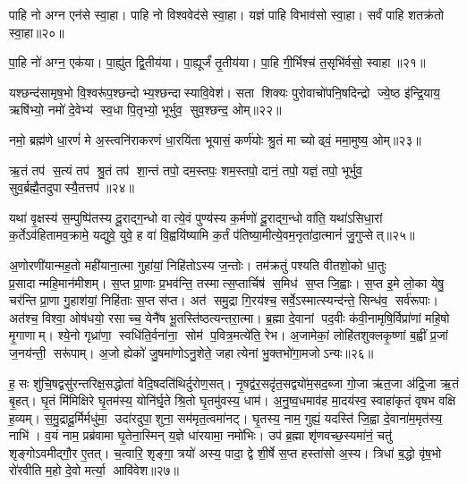 पाहि नो अग्न एन॑से स्वा॒हा। 
पाहि नो विश्ववेद॑से स्वा॒हा। 
यज्ञं पाहि विभाव॑सो स्वा॒हा। 
सर्वं पाहि शतक्र॑तो स्वा॒हा॥२०॥
\anuvakamend

पा॒हि नो॑ अग्न॒ एक॑या। 
पा॒ह्यु॑त द्वि॒तीय॑या। 
पा॒ह्यूर्जं॑ तृ॒तीय॑या। 
पा॒हि गी॒र्भिश्च॑ त॒सृभि॑र्वसो॒ स्वाहा॥२१॥
\anuvakamend

यश्छन्द॑सामृष॒भो वि॒श्वरू॑प॒श्छन्दोभ्य॒श्छन्दास्यावि॒वेश॑। 
सता शिक्यः पुरोवाचो॑पनि॒षदिन्द्रो ज्ये॒ष्ठ इ॑न्द्रि॒याय॒ ऋषि॑भ्यो॒ नमो॑ दे॒वेभ्य॑ स्व॒धा पि॒तृभ्यो॒ भूर्भुव॒ सुव॒श्छन्द॒ ओम्॥२२॥
\anuvakamend


नमो॒ ब्रह्म॑णे धा॒रणं॑ मे अ॒स्त्वनि॑राकरणं धा॒रयि॑ता भूयासं॒ कर्ण॑योः श्रु॒तं मा च्योढ्वं॒ ममा॒मुष्य॒ ओम्॥२३॥
\anuvakamend

ऋ॒तं तप॑ स॒त्यं तप॑ श्रु॒तं तप॑ शा॒न्तं तपो॒ दम॒स्तपः॒ शम॒स्तपो॒ दानं॒ तपो॒ यज्ञं॒ तपो॒ भूर्भुव॒ सुव॒र्ब्रह्मै॒तदुपास्यै॒तत्तप॑॥२४॥
\anuvakamend


यथा॑ वृ॒क्षस्य॑ स॒म्पुष्पि॑तस्य दू॒राद्ग॒न्धो वात्ये॒वं पुण्य॑स्य क॒र्मणो॑ दू॒राद्ग॒न्धो वा॑ति॒ यथा॑ऽसिधा॒रां क॒र्तेऽव॑हितामव॒क्रामे॒ यद्युवे॒ युवे॒ ह वा॑ वि॒ह्वयि॑ष्यामि क॒र्तं प॑तिष्या॒मीत्ये॒वम॒नृता॑दा॒त्मानं॑ जु॒गुप्सेत्॥२५॥
\anuvakamend


अ॒णोरणी॑यान्मह॒तो मही॑याना॒त्मा गुहा॑यां॒ निहि॑तोऽस्य ज॒न्तोः। 
तम॑क्रतुं पश्यति वीतशो॒को धा॒तुः प्र॒सादान्महि॒मान॑\-मीशम्। 
स॒प्त प्रा॒णाः प्र॒भव॑न्ति॒ तस्मात्स॒प्तार्चिष॑ स॒मिध॑ स॒प्त जि॒ह्वाः। 
स॒प्त इ॒मे लो॒का येषु॒ चर॑न्ति प्रा॒णा गु॒हाश॑यां॒ निहि॑ताः स॒प्त स॑प्त। 
अत॑ समु॒द्रा गि॒रय॑श्च॒ सर्वे॒ऽस्मात्स्यन्द॑न्ते॒ सिन्ध॑व॒ सर्व॑रूपाः। 
अत॑श्च॒ विश्वा॒ ओष॑धयो॒ रसाच्च॒ येनै॑ष भू॒तस्ति॑ष्ठत्यन्तरा॒त्मा। 
ब्र॒ह्मा दे॒वानां पद॒वीः क॑वी॒नामृषि॒र्विप्रा॑णां महि॒षो मृ॒गाणाम्। 
श्ये॒नो गृध्रा॑णा॒ स्वधि॑ति॒र्वना॑ना॒ सोम॑ प॒वित्र॒मत्ये॑ति॒ रेभ\sn{}। 
अ॒जामेकां॒ लोहि॑तशुक्लकृ॒ष्णां ब॒ह्वीं प्र॒जां ज॒नय॑न्ती॒ सरू॑पाम्। 
अ॒जो ह्येको॑ जु॒षमा॑णोऽनु॒शेते॒ जहात्येनां भु॒क्तभो॑गा॒मजोऽन्यः॥२६॥

ह॒सः शु॑चि॒षद्वसु॑रन्तरिक्ष॒सद्धोता॑ वेदि॒षदति॑थिर्दुरोण॒सत्। 
नृ॒षद्व॑र॒सदृ॑त॒सद्व्यो॑म॒सद॒ब्जा गो॒जा ऋ॑त॒जा अ॑द्रि॒जा ऋ॒तं बृ॒हत्। 
घृ॒तं मि॑मिक्षिरे घृ॒तम॑स्य॒ योनि॑र्घृ॒ते श्रि॒तो घृ॒तमु॑वस्य॒ धाम॑। 
अ॒नु॒ष्व॒धमाव॑ह मा॒दय॑स्व॒ स्वाहा॑कृतं वृषभ वक्षि ह॒व्यम्। 
स॒मु॒द्रादू॒र्मिर्मधु॑मा॒ उदा॑रदुपा॒शुना॒ सम॑मृत॒त्वमा॑नट्। 
घृ॒तस्य॒ नाम॒ गुह्यं॒ यदस्ति॑ जि॒ह्वा दे॒वाना॑म॒मृत॑स्य॒ नाभि॑। 
व॒यं नाम॒ प्रब्र॑वामा घृ॒तेना॒स्मिन् य॒ज्ञे धा॑रयामा॒ नमो॑भिः। 
उप॑ ब्र॒ह्मा शृ॑णवच्छ॒स्यमा॑नं॒ चतु॑ शृङ्गोऽवमीद्गौ॒र ए॒तत्। 
च॒त्वारि॒ शृङ्गा॒ त्रयो॑ अस्य॒ पादा॒ द्वे शी॒र्\mbox{}षे स॒प्त हस्ता॑सो अ॒स्य। 
त्रिधा॑ ब॒द्धो वृ॑ष॒भो रो॑रवीति म॒हो दे॒वो मर्त्या॒ आवि॑वेश॥२७॥

